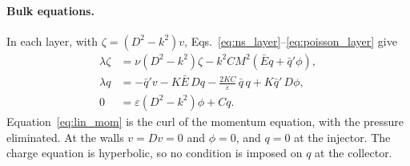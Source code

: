 \documentclass[aip,pof,reprint,amsmath,amssymb]{revtex4-2}
\begin{document}
\paragraph*{Bulk equations.}
In each layer, with $\zeta=(D^2-k^2)v$, Eqs.~\eqref{eq:ns_layer}--\eqref{eq:poisson_layer}
give
\begin{align}
\lambda\zeta&=\nu(D^2-k^2)\zeta-k^2CM^2\left(\bar E q+\bar q'\phi\right),\label{eq:lin_mom}\\
\lambda q&=-\bar q'v-K\bar E\,Dq-\frac{2KC}{\varepsilon}\,\bar q\,q+K\bar q'\,D\phi,
\label{eq:lin_charge}\\
0&=\varepsilon(D^2-k^2)\phi+Cq .\label{eq:lin_poisson}
\end{align}
Equation~\eqref{eq:lin_mom} is the curl of the momentum equation, with the pressure
eliminated. At the walls $v=Dv=0$ and $\phi=0$, and $q=0$ at the injector. The charge
equation is hyperbolic, so no condition is imposed on $q$ at the collector.
\end{document}

